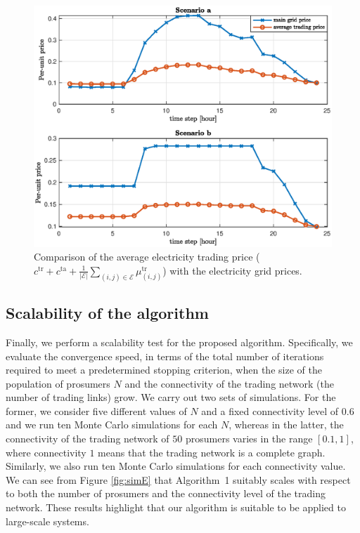 \documentclass{IEEEtran}  %
\newcommand{\mc}{\mathcal}
\newcommand{\0}{\mathbf{0}}
\newcommand{\1}{\mathbf{1}}
\begin{document}
\begin{figure}[t]
	\centering 
	\includegraphics[width=0.9\linewidth]{figures/simB_0402_pt3_v2a}
	\caption{Comparison of the average electricity trading price ($c^{\mathrm{tr}} + c^{\mathrm{ta}} + \tfrac{1}{|\mc E|}\sum_{(i,j)\in \mc E}\mu_{(i,j)}^{\mathrm{tr}}$) with the electricity grid prices.
	}
	\label{fig:sim_B3}
\end{figure}  

\subsection{Scalability of the algorithm}
Finally, we perform a scalability test for the proposed algorithm. Specifically, we evaluate the convergence speed, in terms of the total number of iterations required to meet a predetermined stopping criterion, when the size of the population of prosumers $N$ and the connectivity of the trading network (the number of trading links) grow. We carry out two sets of simulations.
%
For the former, we consider five different values of $N$ and a fixed connectivity level of $0.6$ and we run ten Monte Carlo simulations for each $N$, whereas in the latter, the connectivity of the trading network of $50$ prosumers varies in the range $[0.1,1]$, where connectivity $1$ means that the trading network is a complete graph. Similarly, we also run ten Monte Carlo simulations for each connectivity value. We can see from Figure \ref{fig:simE} that Algorithm~1 suitably scales with respect to both the number of prosumers and the connectivity level of the trading network. These results highlight that our algorithm is suitable to be applied to  large-scale systems. 
\end{document}
